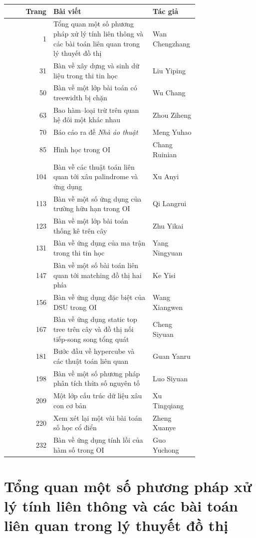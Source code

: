 \documentclass[11pt]{article}
\begin{document}
\begin{center}
\small
\begin{tabular}{r p{0.52\linewidth} p{0.24\linewidth}}
\textbf{Trang} & \textbf{Bài viết} & \textbf{Tác giả} \\
\hline
1 & Tổng quan một số phương pháp xử lý tính liên thông và các bài toán liên quan trong lý thuyết đồ thị & Wan Chengzhang \\
31 & Bàn về xây dựng và sinh dữ liệu trong thi tin học & Liu Yiping \\
50 & Bàn về một lớp bài toán có treewidth bị chặn & Wu Chang \\
63 & Bao hàm--loại trừ trên quan hệ đôi một khác nhau & Zhou Ziheng \\
70 & Báo cáo ra đề \emph{Nhà ảo thuật} & Meng Yuhao \\
85 & Hình học trong OI & Chang Ruinian \\
104 & Bàn về các thuật toán liên quan tới xâu palindrome và ứng dụng & Xu Anyi \\
113 & Bàn về một số ứng dụng của trường hữu hạn trong OI & Qi Langrui \\
123 & Bàn về một lớp bài toán thống kê trên cây & Zhu Yikai \\
131 & Bàn về ứng dụng của ma trận trong thi tin học & Yang Ningyuan \\
147 & Bàn về một số bài toán liên quan tới matching đồ thị hai phía & Ke Yisi \\
156 & Bàn về ứng dụng đặc biệt của DSU trong OI & Wang Xiangwen \\
167 & Bàn về ứng dụng static top tree trên cây và đồ thị nối tiếp-song song tổng quát & Cheng Siyuan \\
181 & Bước đầu về hypercube và các thuật toán liên quan & Guan Yanru \\
198 & Bàn về một số phương pháp phân tích thừa số nguyên tố & Luo Siyuan \\
209 & Một lớp cấu trúc dữ liệu xâu con cơ bản & Xu Tingqiang \\
220 & Xem xét lại một vài bài toán số học cổ điển & Zheng Xuanye \\
232 & Bàn về ứng dụng tính lồi của hàm số trong OI & Guo Yuchong
\end{tabular}
\end{center}

\section{Tổng quan một số phương pháp xử lý tính liên thông và các bài toán liên quan trong lý thuyết đồ thị}
\end{document}

